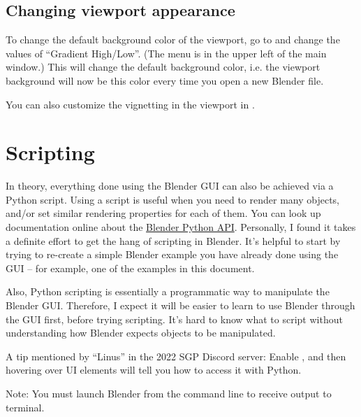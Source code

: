 \documentclass[10pt]{article}
\newcommand{\Menu}[2][]{\begingroup%
\tikzset{menu hack/.cd,#1}%
\menu{#2}%
\endgroup}
\begin{document}
\subsection{Changing viewport appearance}

To change the default background color of the viewport, go to  and change the values of ``Gradient High/Low''. (The \Menu[t>]{Edit} menu is in the upper left of the main window.) This will change the default background color, i.e. the viewport background will now be this color every time you open a new Blender file. %

You can also customize the vignetting in the viewport in .

\section{Scripting}
In theory, everything done using the Blender GUI can also be achieved via a Python script. Using a script is useful when you need to render many objects, and/or set similar rendering properties for each of them. You can look up documentation online about the \href{https://docs.blender.org/api/current/index.html}{Blender Python API}. Personally, I found it takes a definite effort to get the hang of scripting in Blender. It's helpful to start by trying to re-create a simple Blender example you have already done using the GUI -- for example, one of the examples in this document.

Also, Python scripting is essentially a programmatic way to manipulate the Blender GUI. Therefore, I expect it will be easier to learn to use Blender through the GUI first, before trying scripting. It's hard to know what to script without understanding how Blender expects objects to be manipulated.

A tip mentioned by ``Linus'' in the 2022 SGP Discord server: Enable , and then hovering over UI elements will tell you how to access it with Python.

Note: You must launch Blender from the command line to receive output to terminal.
\end{document}
